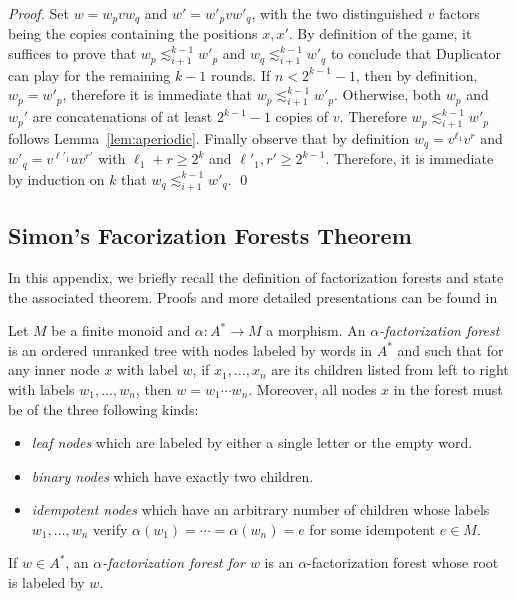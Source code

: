 \documentclass[envcountsame]{llncs}
\newcommand\sieq[2]{\ensuremath{\lesssim^{#1}_{#2}}\xspace}
\newcommand\gmo{\ensuremath{\geqslant}\xspace}
\begin{document}
\begin{proof}
  Set $w=w_pvw_q$ and $w'=w'_pvw'_q$, with the two distinguished $v$ factors 
  being the copies containing the positions $x,x'$. By definition of
  the game, it suffices to prove that $w_p \sieq{k-1}{i+1}
  w'_p$ and $w_q \sieq{k-1}{i+1} w'_q$ to conclude that Duplicator
  can play for the remaining $k-1$ rounds. If $n < 2^{k-1}-1$, then by 
  definition, $w_p=w'_p$, therefore it is immediate that
  $w_p \sieq{k-1}{i+1} w'_p$. Otherwise, both $w_p$ and
  $w_p'$ are concatenations of at least $2^{k-1}-1$ copies of
  $v$. Therefore $w_p \sieq{k-1}{i+1} w'_p$ follows
  Lemma~\ref{lem:aperiodic}. Finally observe that by definition $w_q =
  v^{\ell_1}v^{r}$ and $w'_q=v^{\ell'_1}uv^{r'}$ with $\ell_1 + r \gmo
  2^k$ and $\ell'_1,r' \gmo 2^{k-1}$. Therefore, it is immediate
  by induction on $k$ that $w_q \sieq{k-1}{i+1} w'_q$. \qed
\end{proof}



\subsection{Simon's Facorization Forests Theorem}

In this appendix, we briefly recall the definition of factorization
forests and state the associated theorem. Proofs and 
more detailed presentations can be found in~\cite{kfacto,bfacto}

Let $M$ be a finite monoid and $\alpha: A^* \rightarrow M$ a
morphism. An \emph{$\alpha$-factorization forest} is an ordered
unranked tree with nodes labeled by words in $A^*$ and such that for
any inner node $x$ with label $w$, if $x_1,\dots,x_n$ are its children
listed from left to right with labels $w_1,\dots,w_n$, then
$w=w_1\cdots w_n$. Moreover, all nodes $x$ in the forest must be of
the three following kinds:

\begin{itemize}
\item \emph{leaf nodes} which are labeled by either a single letter or
  the empty word.
\item \emph{binary nodes} which have exactly two children.
\item \emph{idempotent nodes} which have an arbitrary number of
  children whose labels $w_1,\dots,w_n$ verify $\alpha(w_1) = \cdots =
  \alpha(w_n) = e$ for some idempotent $e \in M$.
\end{itemize}

If $w \in A^*$, an \emph{$\alpha$-factorization forest for $w$} is an
$\alpha$-factorization forest whose root is labeled by $w$.
\end{document}
